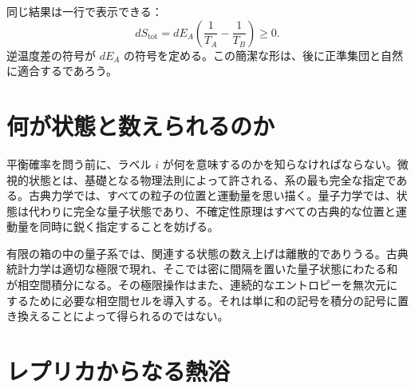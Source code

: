 同じ結果は一行で表示できる：
\begin{equation}
 dS_{\mathrm{tot}}
 =dE_A\left(\frac{1}{T_A}-\frac{1}{T_B}\right)\geq0.
 \label{eq:sm3-compact-flow}
\end{equation}
逆温度差の符号が \(dE_A\) の符号を定める。この簡潔な形は、後に正準集団と自然に適合するであろう。

\begin{classroomqa}
\end{classroomqa}

\section{何が状態と数えられるのか}

平衡確率を問う前に、ラベル \(i\) が何を意味するのかを知らなければならない。微視的状態とは、基礎となる物理法則によって許される、系の最も完全な指定である。古典力学では、すべての粒子の位置と運動量を思い描く。量子力学では、状態は代わりに完全な量子状態であり、不確定性原理はすべての古典的な位置と運動量を同時に鋭く指定することを妨げる。

有限の箱の中の量子系では、関連する状態の数え上げは離散的でありうる。古典統計力学は適切な極限で現れ、そこでは密に間隔を置いた量子状態にわたる和が相空間積分になる。その極限操作はまた、連続的なエントロピーを無次元にするために必要な相空間セルを導入する。それは単に和の記号を積分の記号に置き換えることによって得られるのではない。

\begin{classroomqa}
\end{classroomqa}

\section{レプリカからなる熱浴}

